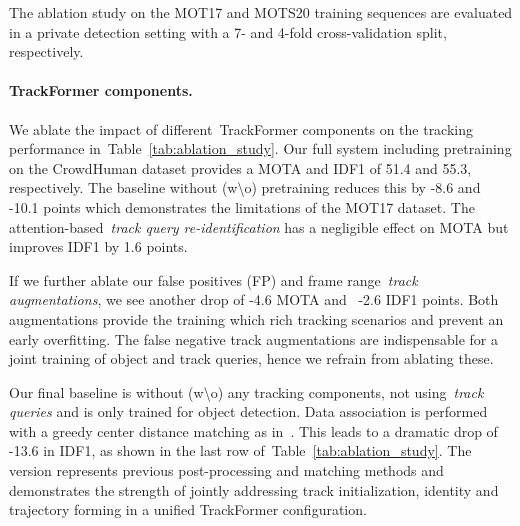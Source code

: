 \documentclass[10pt,twocolumn,letterpaper]{article}
\newcommand{\tabref}[1]{Table~\ref{#1}}
\begin{document}
The ablation study on the MOT17 and MOTS20 training sequences are evaluated in a private detection setting with a 7- and 4-fold cross-validation split, respectively.
\paragraph{TrackFormer components.}
We ablate the impact of different~\mbox{TrackFormer} components on the tracking performance in~\tabref{tab:ablation_study}.
Our full system including pretraining on the CrowdHuman dataset provides a MOTA and IDF1 of 51.4 and 55.3, respectively.
The baseline without (w\textbackslash o) pretraining reduces this by -8.6 and -10.1 points which demonstrates the limitations of the MOT17 dataset.
The attention-based~\textit{track query re-identification} has a negligible effect on MOTA but improves IDF1 by 1.6 points.


If we further ablate our false positives (FP) and frame range~\textit{track augmentations}, we see another drop of -4.6 MOTA and ~\mbox{-2.6} IDF1 points.
Both augmentations provide the training which rich tracking scenarios and prevent an early overfitting.
The false negative track augmentations are indispensable for a joint training of object and track queries, hence we refrain from ablating these.


Our final baseline is without (w\textbackslash o) any tracking components, not using~\textit{track queries} and is only trained for object detection.
Data association is performed with a greedy center distance matching as in~\cite{center_track}.
This leads to a dramatic drop of -13.6 in IDF1, as shown in the last row of~\tabref{tab:ablation_study}.
The version represents previous post-processing and matching methods and demonstrates the strength of jointly addressing track initialization, identity and trajectory forming in a unified TrackFormer configuration.
\end{document}
